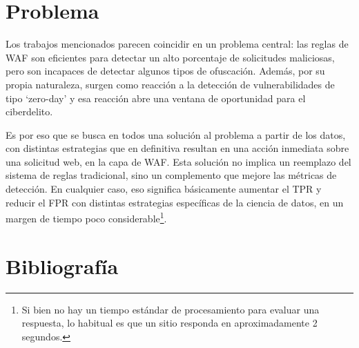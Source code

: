 \documentclass[12pt,a4paper]{article}
\begin{document}
\section*{Problema}

Los trabajos mencionados parecen coincidir en un problema central: las reglas de WAF son eficientes para detectar un alto porcentaje de solicitudes maliciosas, pero son incapaces de detectar algunos tipos de ofuscación. Además, por su propia naturaleza, surgen como reacción a la detección de vulnerabilidades de tipo `zero-day' y esa reacción abre una ventana de oportunidad para el ciberdelito.

Es por eso que se busca en todos una solución al problema a partir de los datos, con distintas estrategias que en definitiva resultan en una acción inmediata sobre una solicitud web, en la capa de WAF. Esta solución no implica un reemplazo del sistema de reglas tradicional, sino un complemento que mejore las métricas de detección. En cualquier caso, eso significa básicamente aumentar el TPR y reducir el FPR con distintas estrategias específicas de la ciencia de datos, en un margen de tiempo poco considerable\footnote{Si bien no hay un tiempo estándar de procesamiento para evaluar una respuesta, lo habitual es que un sitio responda en aproximadamente 2 segundos.}.

\section*{Bibliografía}
\end{document}
